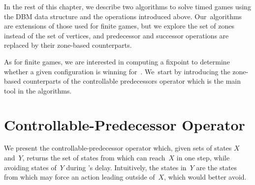 In the rest of this chapter, we describe two algorithms to solve timed
games using the DBM data structure and the operations introduced
above. Our~algorithms are extensions of those used for finite games,
but we explore the set of zones instead of the set of vertices, and
predecessor and successor operations are replaced by their zone-based
counterparts.

As for finite games, we are interested in computing a fixpoint to
determine whether a given configuration is winning for~\Eve. We~start
by introducing the zone-based counterparts of the controllable predecessors operator
which
is the main tool in the algorithms.

\section{Controllable-Predecessor Operator}

We present the controllable-predecessor operator which, given sets of
states $X$ and~$Y$, returns the set of states from which \Eve can
reach~$X$ in one step, while avoiding states of~$Y$ during \Eve's
delay. Intuitively, the states in~$Y$ are the states from which \Adam
may force an action leading outside of~$X$, which \Eve would better avoid.

